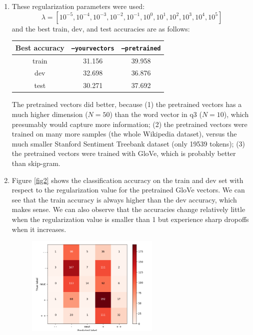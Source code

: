 \documentclass[10pt,reqno]{amsart}
\begin{document}
\begin{enumerate}[topsep=0pt,itemsep=3ex,partopsep=1ex,parsep=1ex]
\begin{enumerate}[itemsep=2ex]
  \item
    These regularization parameters were used:
    \begin{equation*}
      \lambda = [10^{-5}, 10^{-4}, 10^{-3}, 10^{-2}, 10^{-1}, 10^{0}, 10^{1}, 10^{2}, 10^{3}, 10^{4}, 10^{5}]
    \end{equation*}
    and the best train, dev, and test accuracies are as follows:
    \vspace{1mm}
    \begin{center}
      \begin{tabular}{|c|c|c|}
        \hline
        Best accuracy & \texttt{--yourvectors} & \texttt{--pretrained} \\
        \hline
        train & 31.156 & 39.958 \\
        dev & 32.698 & 36.876 \\
        test & 30.271 & 37.692 \\
        \hline
      \end{tabular}
    \end{center}
    \vspace{1mm}
    The pretrained vectors did better, because 
    (1) the pretrained vectors has a much higher dimension ($N=50$) than the
    word vector in q3 ($N=10$), which presumably would capture more information;
    (2) the pretrained vectors were trained on many more samples (the whole Wikipedia dataset), 
    versus the much smaller Stanford Sentiment Treebank dataset (only 19539 tokens);
    (3) the pretrained vectors were trained with GloVe, which is probably better than skip-gram.
  \item
    Figure \ref{fig2} shows the classification accuracy on the train and dev set 
    with respect to the regularization value for the pretrained GloVe vectors.
    We can see that the train accuracy is always higher than the dev accuracy, which 
    makes sense. We can also observe that the accuracies change relatively little when the 
    regularization value is smaller than 1 but experience sharp dropoffs when it increases.
    \begin{figure}[h!]
      \includegraphics[width=0.6\textwidth]{../code/q4_dev_conf.png}

\end{figure}
\end{enumerate}
\end{enumerate}
\end{document}
